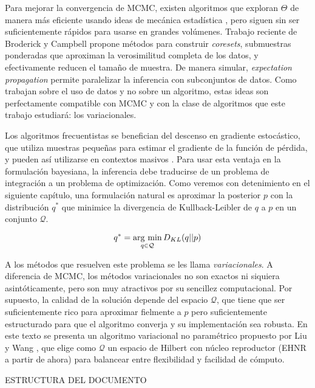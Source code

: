 \documentclass[main.tex]{subfiles}
\begin{document}
Para mejorar la convergencia de MCMC, existen algoritmos que exploran $\Theta$ de manera más eficiente usando ideas de mecánica estadística \cite{betancourt-hmc}, pero siguen sin ser suficientemente rápidos para usarse en grandes volúmenes. Trabajo reciente de Broderick y Campbell \cite{coresets, coresets-greedy} propone métodos para construir \textit{coresets}, submuestras ponderadas que aproximan la verosimilitud completa de los datos, y efectivamente reducen el tamaño de muestra. De manera simular, \textit{expectation propagation} \cite{ep} permite paralelizar la inferencia con subconjuntos de datos. Como trabajan sobre el uso de datos y no sobre un algoritmo, estas ideas son perfectamente compatible con MCMC y con la clase de algoritmos que este trabajo estudiará: los variacionales.

Los algoritmos frecuentistas se benefician del descenso en gradiente estocástico, que utiliza muestras pequeñas para estimar el gradiente de la función de pérdida, y pueden así utilizarse en contextos masivos \cite{goodfellow}. Para usar esta ventaja en la formulación bayesiana, la inferencia debe traducirse de un problema de integración a un problema de optimización. Como veremos con detenimiento en el siguiente capítulo, una formulación natural es aproximar la posterior $p$ con la distribución $q^*$ que minimice la divergencia de Kullback-Leibler de $q$ a $p$ en un conjunto $\mathcal{Q}$.  


\begin{equation}
	q^* = \operatorname*{arg\,\min}_{q \in \mathcal{Q}} D_{KL}(q || p)
	\label{eqn:vi}	
\end{equation}

A los métodos que resuelven este problema se les llama \textit{variacionales}. A diferencia de MCMC, los métodos variacionales no son exactos ni siquiera asintóticamente, pero son muy atractivos por su sencillez computacional. Por supuesto,  la calidad de la solución depende del espacio $\mathcal{Q}$, que tiene que ser suficientemente rico para aproximar fielmente a $p$ pero suficientemente estructurado para que el algoritmo converja y su implementación sea robusta. En este texto se presenta un algoritmo variacional no paramétrico propuesto por Liu y Wang \cite{svgd}, que elige como $\mathcal{Q}$ un espacio de Hilbert con núcleo reproductor (EHNR a partir de ahora) para balancear entre flexibilidad y facilidad de cómputo. 

%
{\color{red} ESTRUCTURA DEL DOCUMENTO}
\end{document}
